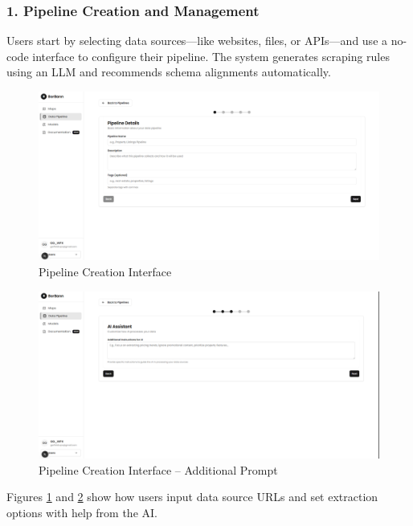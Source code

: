 \subsubsection*{1. Pipeline Creation and Management}

Users start by selecting data sources—like websites, files, or APIs—and use a no-code interface to configure their pipeline. The system generates scraping rules using an LLM and recommends schema alignments automatically.

\begin{figure}[htbp]
	\centering
	\includegraphics[width=1\textwidth]{assets/ai/pipeline-1.png}
	\caption{Pipeline Creation Interface}
	\label{fig:pipeline-creation-ui}
\end{figure}

\begin{figure}[htbp]
	\centering
	\includegraphics[width=1\textwidth]{assets/ai/pipeline-3.png}
	\caption{Pipeline Creation Interface – Additional Prompt}
	\label{fig:pipeline-creation-ui-2}
\end{figure}

Figures \ref{fig:pipeline-creation-ui} and \ref{fig:pipeline-creation-ui-2} show how users input data source URLs and set extraction options with help from the AI.

